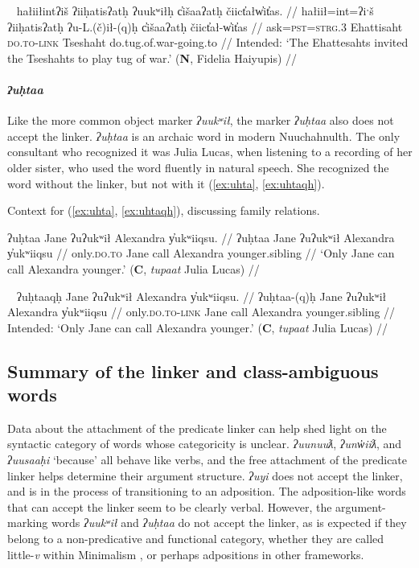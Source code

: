 \ex~ \label{ex:tugofwar2}
\begingl
\glpreamble *hałiiłintʔiš ʔiiḥatisʔatḥ ʔuukʷiłḥ c̓išaaʔatḥ čiict̓ałw̓it̓as. //
\gla hałiił=int=ʔiˑš ʔiiḥatisʔatḥ ʔu-L.(č)ił-(q)ḥ c̓išaaʔatḥ čiict̓ał-w̓it̓as //
\glb ask=\textsc{pst}=\textsc{strg.3} Ehattisaht \textsc{do.to}-\textsc{link} Tseshaht do.tug.of.war-going.to //
\glft Intended: `The Ehattesahts invited the Tseshahts to play tug of war.' (\textbf{N}, Fidelia Haiyupis) //
\endgl
\xe

\paragraph{\textit{ʔuḥtaa}} \label{ch:link:uhta} Like the more common object marker \textit{ʔuukʷił}, the marker \textit{ʔuḥtaa} also does not accept the linker. \textit{ʔuḥtaa} is an archaic word in modern Nuuchahnulth. The only consultant who recognized it was Julia Lucas, when listening to a recording of her older sister, who used the word fluently in natural speech. She recognized the word without the linker, but not with it (\ref{ex:uhta}, \ref{ex:uhtaqh}).

\vspace{5pt}

\noindent Context for (\ref{ex:uhta}, \ref{ex:uhtaqh}), discussing family relations.

\ex \label{ex:uhta}
\begingl
\glpreamble ʔuḥtaa Jane ʔuʔukʷił Alexandra y̓ukʷiiqsu. //
\gla ʔuḥtaa Jane ʔuʔukʷił Alexandra y̓ukʷiiqsu //
\glb only.\textsc{do.to} Jane call Alexandra younger.sibling //
\glft `Only Jane can call Alexandra younger.' (\textbf{C}, \textit{tupaat} Julia Lucas) //
\endgl
\xe

\ex~ \label{ex:uhtaqh}
\begingl
\glpreamble *ʔuḥtaaqḥ Jane ʔuʔukʷił Alexandra y̓ukʷiiqsu. //
\gla ʔuḥtaa-(q)ḥ Jane ʔuʔukʷił Alexandra y̓ukʷiiqsu //
\glb only.\textsc{do.to}-\textsc{link} Jane call Alexandra younger.sibling //
\glft Intended: `Only Jane can call Alexandra younger.' (\textbf{C}, \textit{tupaat} Julia Lucas) //
\endgl
\xe

\subsection{Summary of the linker and class-ambiguous words}

Data about the attachment of the predicate linker can help shed light on the syntactic category of words whose categoricity is unclear. \textit{ʔuunuuƛ}, \textit{ʔunw̓iiƛ}, and \textit{ʔuusaaḥi} `because' all behave like verbs, and the free attachment of the predicate linker helps determine their argument structure. \textit{ʔuyi} does not accept the linker, and is in the process of transitioning to an adposition. The adposition-like words that can accept the linker seem to be clearly verbal. However, the argument-marking words \textit{ʔuukʷił} and \textit{ʔuḥtaa} do not accept the linker, as is expected if they belong to a non-predicative and functional category, whether they are called little-\textit{v} within Minimalism \citep{woo2007b}, or perhaps adpositions in other frameworks.

